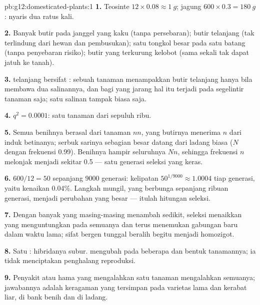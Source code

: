 \begin{solution}{pb:g12:domesticated-plants:1}
\textbf{1.} Teosinte $12 \times 0.08 \approx \qty{1}{g}$; jagung $600
\times 0.3 = \qty{180}{g}$: nyaris dua ratus kali.

\textbf{2.} Banyak butir pada janggel yang kaku (tanpa persebaran);
butir telanjang (tak terlindung dari hewan dan pembusukan); satu
tongkol besar pada satu batang (tanpa penyebaran risiko); butir yang
terkurung kelobot (sama sekali tak dapat jatuh ke tanah).

\textbf{3.}  telanjang bersifat : sebuah tanaman
menampakkan butir telanjang hanya bila membawa dua salinannya, dan
bagi  yang jarang hal itu terjadi pada segelintir tanaman saja;
 satu salinan tampak biasa saja.

\textbf{4.} $q^2 = 0.0001$: satu tanaman dari sepuluh ribu.

\textbf{5.} Semua benihnya berasal dari tanaman $nn$, yang butirnya
menerima $n$ dari induk betinanya; serbuk sarinya sebagian besar
datang dari ladang biasa ($N$ dengan frekuensi 0.99). Benihnya hampir
seluruhnya $Nn$, sehingga frekuensi $n$ melonjak menjadi sekitar 0.5
--- satu generasi seleksi yang keras.

\textbf{6.} $600/12 = 50$ sepanjang 9000 generasi: kelipatan $50^{1/9000}
\approx 1.0004$ tiap generasi, yaitu kenaikan 0.04\%. Langkah mungil,
yang berbunga sepanjang ribuan generasi, menjadi perubahan yang besar
--- itulah hitungan seleksi.

\textbf{7.} Dengan banyak  yang masing-masing menambah sedikit,
seleksi menaikkan  yang menguntungkan pada semuanya dan
terus menemukan gabungan baru dalam waktu lama; sifat bergen tunggal
beralih begitu   menjadi homozigot.

\textbf{8.} Satu : hibridanya subur.  mengubah
 pada beberapa  dan bentuk tanamannya; ia tidak
menciptakan penghalang reproduksi.

\textbf{9.} Penyakit atau hama yang mengalahkan satu tanaman
mengalahkan semuanya; jawabannya adalah keragaman yang tersimpan pada
varietas lama dan kerabat liar, di bank benih dan di ladang.


\end{solution}
